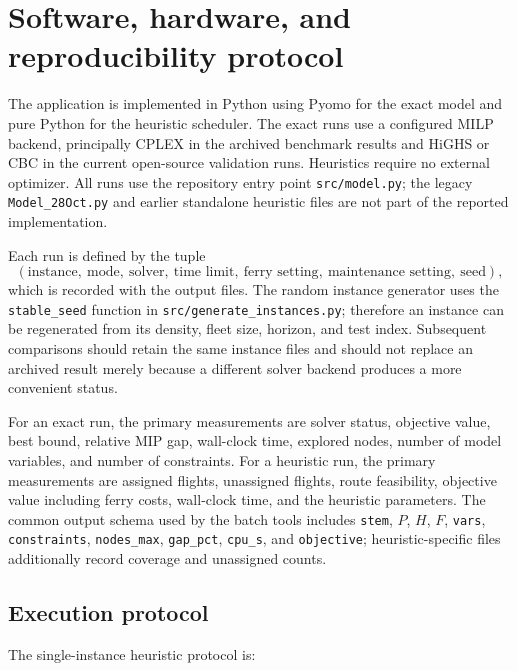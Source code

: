 \section{Software, hardware, and reproducibility protocol}
\label{sec:computational_protocol}

The application is implemented in Python using Pyomo for the exact model and
pure Python for the heuristic scheduler. The exact runs use a configured MILP
backend, principally CPLEX in the archived benchmark results and HiGHS or CBC
in the current open-source validation runs. Heuristics require no external
optimizer. All runs use the repository entry point \texttt{src/model.py}; the
legacy \texttt{Model\_28Oct.py} and earlier standalone heuristic files are not
part of the reported implementation.

Each run is defined by the tuple
\begin{equation}
    (\text{instance},\ \text{mode},\ \text{solver},\ \text{time limit},\
    \text{ferry setting},\ \text{maintenance setting},\ \text{seed}),
\end{equation}
which is recorded with the output files. The random instance generator uses
the \texttt{stable\_seed} function in
\texttt{src/generate\_instances.py}; therefore
an instance can be regenerated from its density, fleet size, horizon, and test
index. Subsequent comparisons should retain the same instance files and should
not replace an archived result merely because a different solver backend
produces a more convenient status.

For an exact run, the primary measurements are solver status, objective value,
best bound, relative MIP gap, wall-clock time, explored nodes, number of model
variables, and number of constraints. For a heuristic run, the primary
measurements are assigned flights, unassigned flights, route feasibility,
objective value including ferry costs, wall-clock time, and the heuristic
parameters. The common output schema used by the batch tools includes
\texttt{stem}, $P$, $H$, $F$, \texttt{vars}, \texttt{constraints},
\texttt{nodes\_max}, \texttt{gap\_pct}, \texttt{cpu\_s}, and \texttt{objective};
heuristic-specific files additionally record coverage and unassigned counts.

\subsection{Execution protocol}

The single-instance heuristic protocol is:


